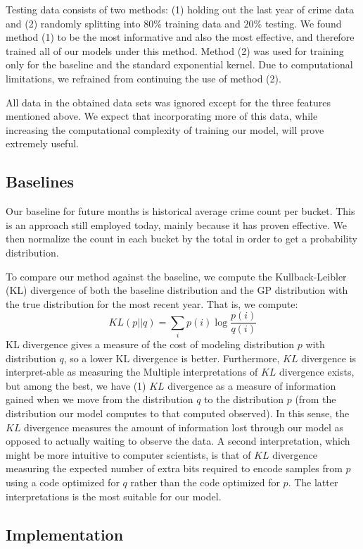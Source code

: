 \documentclass[letterpaper, 11 pt, conference]{ieeeconf}  %
\begin{document}
Testing data consists of two methods: (1) holding out the last year of crime data and (2) randomly splitting into $80\%$ training data and $20\%$ testing. We found method (1) to be the most informative and also the most effective, and therefore trained all of our models under this method. Method (2) was used for training only for the baseline and the standard exponential kernel. Due to computational limitations, we refrained from continuing the use of method (2).

All data in the obtained data sets was ignored except for the three features mentioned above. We expect that incorporating more of this data, while increasing the computational complexity of training our model, will prove extremely useful.

\subsection{Baselines}

Our baseline for future months is historical average crime count per bucket. This is an approach still employed today, mainly because it has proven effective. We then normalize the count in each bucket by the total in order to get a probability distribution.

To compare our method against the baseline, we compute the Kullback-Leibler (KL) divergence of both the baseline distribution and the GP distribution with the true distribution for the most recent year. That is, we compute:
$$KL(p||q) = \sum_i p(i) \log \frac{p(i)}{q(i)}$$
KL divergence gives a measure of the cost of modeling distribution $p$ with distribution $q$, so a lower KL divergence is better. Furthermore, $KL$ divergence is interpret-able as measuring the  Multiple interpretations of $KL$ divergence exists, but among the best, we have (1) $KL$ divergence as a measure of information gained when we move from the distribution $q$ to the distribution $p$ (from the distribution our model computes to that computed observed). In this sense, the $KL$ divergence measures the amount of information lost through our model as opposed to actually waiting to observe the data. A second interpretation, which might be more intuitive to computer scientists, is that of $KL$ divergence measuring the expected number of extra bits required to encode samples from $p$ using a code optimized for $q$ rather than the code optimized for $p$. The latter interpretations is the most suitable for our model.

\subsection{Implementation}
\end{document}
